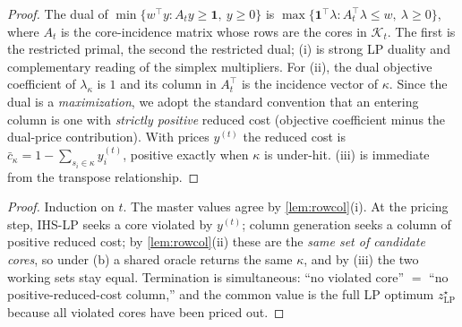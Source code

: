 \begin{proof}
The dual of $\min\{w^\top y : A_t y \ge \mathbf 1,\ y \ge 0\}$ is $\max\{\mathbf
1^\top\lambda : A_t^\top \lambda \le w,\ \lambda \ge 0\}$, where $A_t$ is the
core-incidence matrix whose rows are the cores in $\mathcal{K}_t$. The first is
the restricted primal, the second the restricted dual; (i) is strong LP duality
and complementary reading of the simplex multipliers. For (ii), the dual
objective coefficient of $\lambda_\kappa$ is $1$ and its column in $A_t^\top$ is
the incidence vector of $\kappa$. Since the dual is a \emph{maximization}, we
adopt the standard convention that an entering column is one with
\emph{strictly positive} reduced cost (objective coefficient minus the
dual-price contribution). With prices $y^{(t)}$ the reduced cost is
$\bar c_\kappa = 1 - \sum_{s_i \in \kappa} y^{(t)}_i$, positive exactly when
$\kappa$ is under-hit. (iii) is immediate from the transpose relationship.
\end{proof}


\begin{proof}
Induction on $t$. The master values agree by \cref{lem:rowcol}(i). At the
pricing step, IHS-LP seeks a core violated by $y^{(t)}$; column generation seeks
a column of positive reduced cost; by \cref{lem:rowcol}(ii) these are the
\emph{same set of candidate cores}, so under (b) a shared oracle returns the
same $\kappa$, and by (iii) the two working sets stay equal. Termination is
simultaneous: ``no violated core'' $=$ ``no positive-reduced-cost column,'' and
the common value is the full LP optimum $z^\star_{\mathrm{LP}}$ because all
violated cores have been priced out.
\end{proof}

